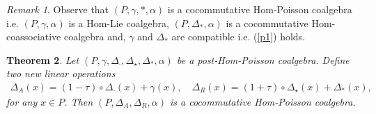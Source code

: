\documentclass{article}
\newtheorem{thm}{Theorem}[section]
\theoremstyle{definition}
\theoremstyle{remark}
\newtheorem{rem}[thm]{Remark}
\numberwithin{equation}{section}
\begin{document}
\begin{rem}
Observe that $(P, \gamma, \ast, \alpha)$ is a cocommutative Hom-Poisson coalgebra \cite{DY1} i.e.
$(P, \gamma, \alpha)$ is a Hom-Lie coalgebra, $(P, \Delta_\ast, \alpha)$ is a cocommutative Hom-coassociative coalgebra and,
$\gamma$ and $\Delta_\ast$ are compatible i.e. (\ref{p1}) holds.
\end{rem}
\begin{thm}
 Let $(P, \gamma, \Delta_\cdot, \Delta_\star, \Delta_\ast, \alpha)$ be a post-Hom-Poisson coalgebra. Define two new linear operations
\begin{eqnarray}
\Delta_A(x)=(1-\tau)\circ\Delta_\cdot(x) +\gamma(x), \quad \Delta_R(x)=(1+\tau)\circ\Delta_\star(x)+\Delta_\ast(x), \nonumber
\end{eqnarray}
for any $x\in P$. Then $(P, \Delta_A, \Delta_R, \alpha)$ is a cocommutative Hom-Poisson coalgebra.
\end{thm}
\end{document}
